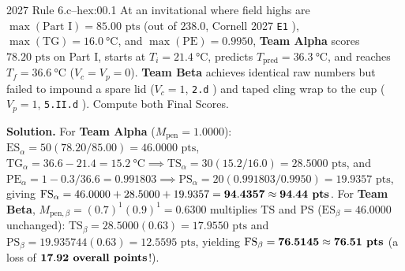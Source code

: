 \begin{workedexample}{2027 Rule 6.c--h}{ex:00.1}
\setlength{\abovedisplayskip}{2pt}\setlength{\belowdisplayskip}{2pt}
At an invitational where field highs are $\max(\text{Part I}) = 85.00\text{ pts}$ (out of $238.0$, Cornell 2027 \texttt{E1} ), $\max(\mathrm{TG}) = \SI{16.0}{\celsius}$, and $\max(\mathrm{PE}) = 0.9950$, \textbf{Team Alpha} scores $78.20\text{ pts}$ on Part I, starts at $T_i = \SI{21.4}{\celsius}$, predicts $T_{\mathrm{pred}} = \SI{36.3}{\celsius}$, and reaches $T_f = \SI{36.6}{\celsius}$ ($V_c = V_p = 0$). \textbf{Team Beta} achieves identical raw numbers but failed to impound a spare lid ($V_c = 1$, \texttt{2.d} ) and taped cling wrap to the cup ($V_p = 1$, \texttt{5.II.d} ). Compute both Final Scores.
\par\smallskip\noindent
\textbf{Solution.} For \textbf{Team Alpha} ($M_{\mathrm{pen}} = 1.0000$): $\mathrm{ES}_\alpha = 50(78.20/85.00) = 46.0000\text{ pts}$, $\mathrm{TG}_\alpha = 36.6 - 21.4 = \SI{15.2}{\celsius} \implies \mathrm{TS}_\alpha = 30(15.2/16.0) = 28.5000\text{ pts}$, and $\mathrm{PE}_\alpha = 1 - 0.3/36.6 = 0.991803 \implies \mathrm{PS}_\alpha = 20(0.991803/0.9950) = 19.9357\text{ pts}$, giving $\mathrm{FS}_\alpha = 46.0000 + 28.5000 + 19.9357 = \mathbf{94.4357 \approx 94.44\text{\textbf{ pts}}}$.
For \textbf{Team Beta}, $M_{\mathrm{pen},\beta} = (0.7)^1(0.9)^1 = 0.6300$ multiplies $\mathrm{TS}$ and $\mathrm{PS}$ ($\mathrm{ES}_\beta = 46.0000$ unchanged): $\mathrm{TS}_\beta = 28.5000(0.63) = 17.9550\text{ pts}$ and $\mathrm{PS}_\beta = 19.935744(0.63) = 12.5595\text{ pts}$, yielding $\mathrm{FS}_\beta = \mathbf{76.5145 \approx 76.51\text{\textbf{ pts}}}$ (a loss of $\mathbf{17.92\text{\textbf{ overall points}}}$!).
\end{workedexample}

